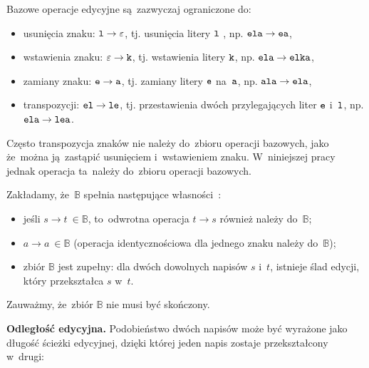 \documentclass{praca1}
\begin{document}
Bazowe operacje edycyjne są~zazwyczaj ograniczone do:
\begin{itemize}
\item usunięcia znaku: $\verb|l| \rightarrow \varepsilon$, tj. usunięcia litery $\verb|l|$ , np. $\verb|ela| \rightarrow \verb|ea|$,
\item wstawienia znaku: $\varepsilon \rightarrow \verb|k|$, tj. wstawienia litery $\verb|k|$, np. $\verb|ela| \rightarrow \verb|elka|$,
\item zamiany znaku: $\verb|e| \rightarrow \verb|a|$, tj. zamiany litery $\verb|e|$ na~$\verb|a|$, np. $\verb|ala| \rightarrow \verb|ela|$,
\item transpozycji: $\verb|el| \rightarrow \verb|le|$, tj. przestawienia dwóch przylegających liter $\verb|e|$ i~$\verb|l|$, np. $\verb|ela| \rightarrow \verb|lea|$.
\end{itemize}

Często transpozycja znaków nie należy do~zbioru operacji bazowych, jako że~można ją~zastąpić usunięciem i~wstawieniem znaku. W~niniejszej pracy jednak operacja ta~należy do~zbioru operacji bazowych.


\begin{property}\label{wl:001}
Zakładamy, że~$\mathbb{B}$ spełnia następujące własności~\cite{Boytsov2011:indexingmethods}:
\begin{itemize}
\item jeśli $s \rightarrow t~\in \mathbb{B}$, to~odwrotna operacja $t \rightarrow s$ również należy do~$\mathbb{B}$;
\item $a \rightarrow a~\in \mathbb{B}$ (operacja identycznościowa dla jednego znaku należy do~$\mathbb{B}$);
\item zbiór $\mathbb{B}$ jest zupełny: dla dwóch dowolnych napisów $s$ i~$t$, istnieje ślad edycji, który przekształca $s$ w~$t$.
\end{itemize}
\end{property}

Zauważmy, że~zbiór $\mathbb{B}$ nie musi być skończony.

\textbf{Odległość edycyjna.} Podobieństwo dwóch napisów może być wyrażone jako długość ścieżki edycyjnej, dzięki której jeden napis zostaje przekształcony w~drugi:
\end{document}
